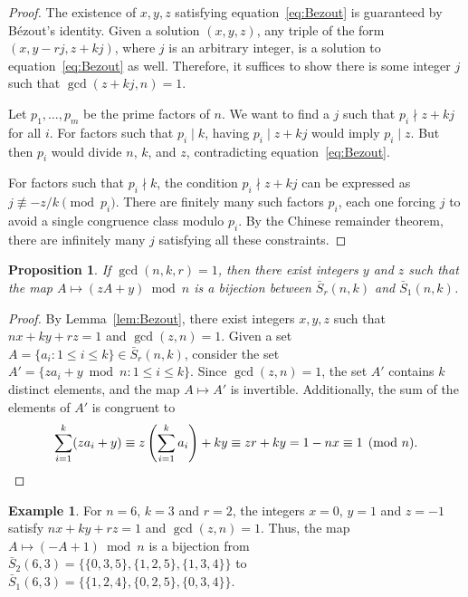 \documentclass[12pt]{article}
\newcommand{\bS}{\bar{S}}
\newtheorem{proposition}[theorem]{Proposition}
\theoremstyle{definition}
\newtheorem{example}{Example}
\begin{document}
\begin{proof}
    The existence of $x, y, z$ satisfying equation~\eqref{eq:Bezout} is guaranteed by
    B\'ezout's identity. Given a solution $(x,y,z)$, any triple of the form $(x,
    y - rj, z + kj)$, where $j$ is an arbitrary integer, is a solution to
    equation~\eqref{eq:Bezout} as well. Therefore, it suffices to show there is
    some integer $j$ such that $\gcd(z + kj, n) = 1$.

    Let $p_1,\dots,p_m$ be the prime factors of $n$. We want to find a $j$ such that $p_i\nmid z+kj$ for all $i$. For factors such that $p_i\mid k$, having $p_i\mid z+kj$ would imply $p_i\mid z$. But then $p_i$ would divide $n$, $k$, and $z$, contradicting equation~\eqref{eq:Bezout}.
    
    For factors such that $p_i\nmid k$, the condition $p_i\nmid z+kj$ can be expressed as $j \not\equiv
    -z / k \pmod{p_i}$. There are finitely many such factors $p_i$, each one
    forcing $j$ to avoid a single congruence class modulo $p_i$. By the Chinese
    remainder theorem, there are infinitely many $j$ satisfying all these
    constraints.
\end{proof}

\begin{proposition}    
    If $\gcd(n, k, r) = 1$, then there exist integers $y$ and $z$ such that the
    map $A \mapsto (zA + y) \bmod n$ is a bijection between $\bS_r(n, k)$ and
    $\bS_1(n, k)$.
\end{proposition}

\begin{proof}
    By Lemma~\ref{lem:Bezout}, there exist integers $x, y, z$ such that
    $nx + ky + rz = 1$ and $\gcd(z, n) = 1$. 
    Given a set $A=\{a_i:1\le i\le k\}\in \bS_r(n, k)$, consider the set $A'=\{z a_i + y \bmod n:1\le i \le k\}$. Since $\gcd(z,n)=1$, the set $A'$ contains $k$ distinct elements, and the map $A\mapsto A'$ is invertible. Additionally, the sum of the elements of $A'$ is congruent to 
    $$\sum_{i=1}^k (z a_i + y) \equiv z \left(\sum_{i=1}^k a_i\right) + ky \equiv zr + ky = 1 - nx \equiv 1 \pmod{n}.\qedhere$$
\end{proof}

\begin{example}
    For $n=6$, $k=3$ and $r=2$, the integers $x=0$, $y=1$ and $z=-1$ satisfy $nx + ky + rz = 1$ and $\gcd(z, n) = 1$. Thus, the map $A \mapsto (-A + 1) \bmod n$ is a bijection from $\bS_2(6,3)=\{\{0,3,5\},\{1,2,5\},\{1,3,4\}\}$ to $\bS_1(6,3)=\{\{1,2,4\},\{0,2,5\},\{0,3,4\}\}$.
\end{example}
\end{document}
